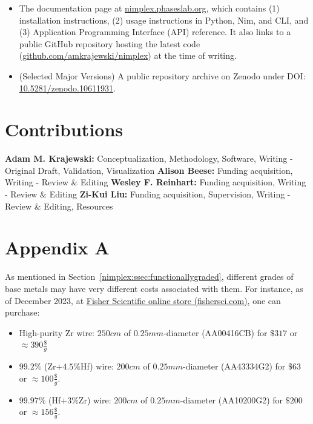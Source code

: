 \begin{itemize}
    \item The documentation page at \href{https://nimplex.phaseslab.org}{nimplex.phaseslab.org}, which contains (1) installation instructions, (2) usage instructions in Python, Nim, and CLI, and (3) Application Programming Interface (API) reference. It also links to a public GitHub repository hosting the latest code (\href{https://github.com/amkrajewski/nimplex}{github.com/amkrajewski/nimplex}) at the time of writing.


    \item (Selected Major Versions) A public repository archive on Zenodo under DOI: \href{https://doi.org/10.5281/zenodo.10611931}{10.5281/zenodo.10611931}.
\end{itemize}

\section*{Contributions}
\textbf{Adam M. Krajewski:} Conceptualization, Methodology, Software, Writing - Original Draft, Validation, Visualization
\textbf{Alison Beese:} Funding acquisition, Writing - Review \& Editing
\textbf{Wesley F. Reinhart:} Funding acquisition, Writing - Review \& Editing
\textbf{Zi-Kui Liu:} Funding acquisition, Supervision, Writing - Review \& Editing, Resources


\section{Appendix A} \label{nimplex:app1}

As mentioned in Section~\ref{nimplex:ssec:functionallygraded}, different grades of base metals may have very different costs associated with them. For instance, as of December 2023, at \href{https://www.fishersci.com}{Fisher Scientific online store (fishersci.com)}, one can purchase:
\begin{itemize}
    \item High-purity Zr wire: $250cm$ of $0.25mm$-diameter (AA00416CB) for $\$317$ or $\approx 390\frac{\$}{g}$
    \item $99.2\%$ (Zr+$4.5\%$Hf) wire: $200cm$ of $0.25mm$-diameter (AA43334G2) for $\$63$ or $\approx 100\frac{\$}{g}$. 
    \item $99.97\%$ (Hf+$3\%$Zr) wire: $200cm$ of $0.25mm$-diameter (AA10200G2) for $\$200$ or $\approx 156\frac{\$}{g}$. 
\end{itemize} 

